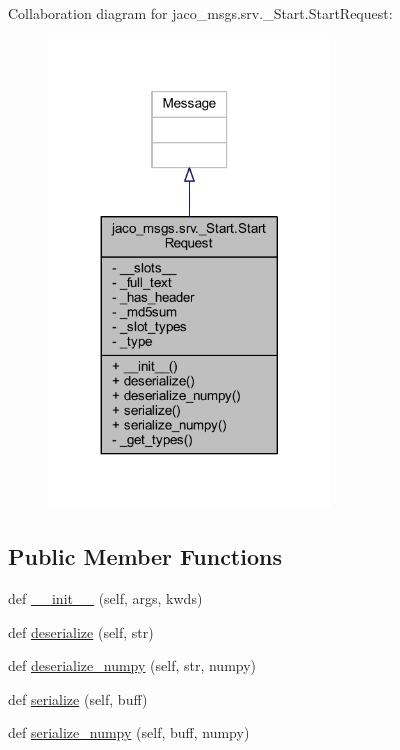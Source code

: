 Collaboration diagram for jaco\+\_\+msgs.\+srv.\+\_\+\+Start.\+Start\+Request\+:
\nopagebreak
\begin{figure}[H]
\begin{center}
\leavevmode
\includegraphics[width=212pt]{d7/d35/classjaco__msgs_1_1srv_1_1__Start_1_1StartRequest__coll__graph}
\end{center}
\end{figure}
\subsection*{Public Member Functions}
\begin{DoxyCompactItemize}
\item 
def \hyperlink{classjaco__msgs_1_1srv_1_1__Start_1_1StartRequest_a4b6aa2cc1817f09daf4e0be98c061f99}{\+\_\+\+\_\+init\+\_\+\+\_\+} (self, args, kwds)
\item 
def \hyperlink{classjaco__msgs_1_1srv_1_1__Start_1_1StartRequest_aaf952dd1ce70165e4fe5a1011f816bfe}{deserialize} (self, str)
\item 
def \hyperlink{classjaco__msgs_1_1srv_1_1__Start_1_1StartRequest_addfdb111ee3f87dc3f328fe23b53dd9b}{deserialize\+\_\+numpy} (self, str, numpy)
\item 
def \hyperlink{classjaco__msgs_1_1srv_1_1__Start_1_1StartRequest_abd07c5abf1227cd7f4fcbe32872af3ef}{serialize} (self, buff)
\item 
def \hyperlink{classjaco__msgs_1_1srv_1_1__Start_1_1StartRequest_ae1b9e23c7466b85dec9ef41f119af87e}{serialize\+\_\+numpy} (self, buff, numpy)
\end{DoxyCompactItemize}
